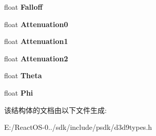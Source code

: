 \begin{DoxyCompactItemize}
float {\bfseries Falloff}
\item 
\mbox{\label{struct___d3_d_l_i_g_h_t9_a19807ce9458f412138c558610839632a}} 
float {\bfseries Attenuation0}
\item 
\mbox{\label{struct___d3_d_l_i_g_h_t9_af0b8b2632c25dabbdc7f9b3c4373ecf5}} 
float {\bfseries Attenuation1}
\item 
\mbox{\label{struct___d3_d_l_i_g_h_t9_a373f883992f22a06b5970cd537dcf79a}} 
float {\bfseries Attenuation2}
\item 
\mbox{\label{struct___d3_d_l_i_g_h_t9_a6e115bc336d83cd50f8b72e91fd0746f}} 
float {\bfseries Theta}
\item 
\mbox{\label{struct___d3_d_l_i_g_h_t9_a87bd016f9b418a56eede600a3084bc2a}} 
float {\bfseries Phi}
\end{DoxyCompactItemize}


该结构体的文档由以下文件生成\+:\begin{DoxyCompactItemize}
\item 
E\+:/\+React\+O\+S-\/0../sdk/include/psdk/d3d9types.\+h\end{DoxyCompactItemize}

